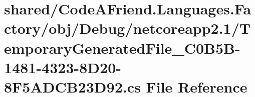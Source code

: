 \hypertarget{shared_2_code_a_friend_8_languages_8_factory_2obj_2_debug_2netcoreapp2_81_2_temporary_generated_f54a9f1f1b8e26d23ef09af8b844e261}{}\section{shared/\+Code\+A\+Friend.Languages.\+Factory/obj/\+Debug/netcoreapp2.1/\+Temporary\+Generated\+File\+\_\+C0\+B5\+B-\/1481-\/4323-\/8\+D20-\/8\+F5\+A\+D\+C\+B23\+D92.cs File Reference}
\label{shared_2_code_a_friend_8_languages_8_factory_2obj_2_debug_2netcoreapp2_81_2_temporary_generated_f54a9f1f1b8e26d23ef09af8b844e261}
